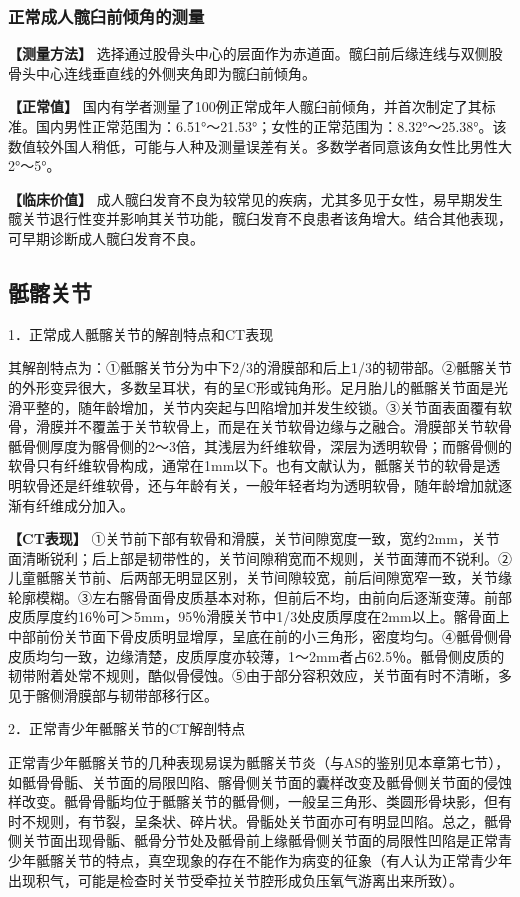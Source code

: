 \subsubsection{正常成人髋臼前倾角的测量}

\textbf{【测量方法】}
选择通过股骨头中心的层面作为赤道面。髋臼前后缘连线与双侧股骨头中心连线垂直线的外侧夹角即为髋臼前倾角。

\textbf{【正常值】}
国内有学者测量了100例正常成年人髋臼前倾角，并首次制定了其标准。国内男性正常范围为：6.51°～21.53°；女性的正常范围为：8.32°～25.38°。该数值较外国人稍低，可能与人种及测量误差有关。多数学者同意该角女性比男性大2°～5°。

\textbf{【临床价值】}
成人髋臼发育不良为较常见的疾病，尤其多见于女性，易早期发生髋关节退行性变并影响其关节功能，髋臼发育不良患者该角增大。结合其他表现，可早期诊断成人髋臼发育不良。

\subsection{骶髂关节}

1．正常成人骶髂关节的解剖特点和CT表现

其解剖特点为：①骶髂关节分为中下2/3的滑膜部和后上1/3的韧带部。②骶髂关节的外形变异很大，多数呈耳状，有的呈C形或钝角形。足月胎儿的骶髂关节面是光滑平整的，随年龄增加，关节内突起与凹陷增加并发生绞锁。③关节面表面覆有软骨，滑膜并不覆盖于关节软骨上，而是在关节软骨边缘与之融合。滑膜部关节软骨骶骨侧厚度为髂骨侧的2～3倍，其浅层为纤维软骨，深层为透明软骨；而髂骨侧的软骨只有纤维软骨构成，通常在1mm以下。也有文献认为，骶髂关节的软骨是透明软骨还是纤维软骨，还与年龄有关，一般年轻者均为透明软骨，随年龄增加就逐渐有纤维成分加入。

\textbf{【CT表现】}
①关节前下部有软骨和滑膜，关节间隙宽度一致，宽约2mm，关节面清晰锐利；后上部是韧带性的，关节间隙稍宽而不规则，关节面薄而不锐利。②儿童骶髂关节前、后两部无明显区别，关节间隙较宽，前后间隙宽窄一致，关节缘轮廓模糊。③左右髂骨面骨皮质基本对称，但前后不均，由前向后逐渐变薄。前部皮质厚度约16％可＞5mm，95％滑膜关节中1/3处皮质厚度在2mm以上。髂骨面上中部前份关节面下骨皮质明显增厚，呈底在前的小三角形，密度均匀。④骶骨侧骨皮质均匀一致，边缘清楚，皮质厚度亦较薄，1～2mm者占62.5％。骶骨侧皮质的韧带附着处常不规则，酷似骨侵蚀。⑤由于部分容积效应，关节面有时不清晰，多见于髂侧滑膜部与韧带部移行区。

2．正常青少年骶髂关节的CT解剖特点

正常青少年骶髂关节的几种表现易误为骶髂关节炎（与AS的鉴别见本章第七节），如骶骨骨骺、关节面的局限凹陷、髂骨侧关节面的囊样改变及骶骨侧关节面的侵蚀样改变。骶骨骨骺均位于骶髂关节的骶骨侧，一般呈三角形、类圆形骨块影，但有时不规则，有节裂，呈条状、碎片状。骨骺处关节面亦可有明显凹陷。总之，骶骨侧关节面出现骨骺、骶骨分节处及骶骨前上缘骶骨侧关节面的局限性凹陷是正常青少年骶髂关节的特点，真空现象的存在不能作为病变的征象（有人认为正常青少年出现积气，可能是检查时关节受牵拉关节腔形成负压氧气游离出来所致）。

